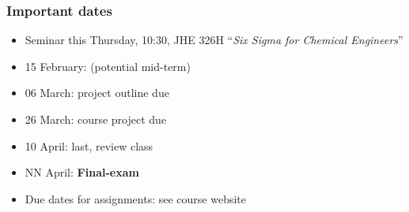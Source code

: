 \begin{frame}\frametitle{Important dates}
	\begin{itemize}
		\item	Seminar this Thursday, 10:30, JHE 326H ``\emph{Six Sigma for Chemical Engineers}''
		\item	15 February: (potential mid-term)
		\item	06 March: project outline due 
		\item	26 March: course project due
		\item	10 April: last, review class
		\item	NN April: \textbf{Final-exam }
	\end{itemize}
	\begin{itemize}
		\item	Due dates for assignments: see course website 
	\end{itemize}
\end{frame}

